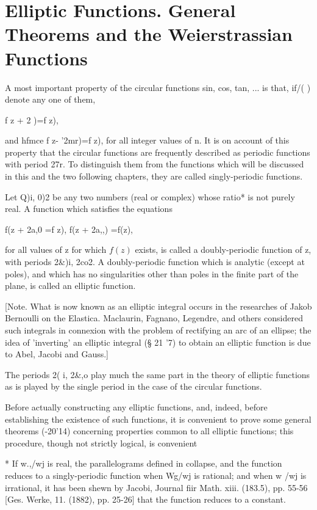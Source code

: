 %
%
\chapter{Elliptic Functions. General Theorems and the
Weierstrassian Functions}


A most important property of the circular functions sin, cos, tan,
... is that, if/( ) denote any one of them,

f z + 2 )=f z),

and hfmce f z- '2mr)=f z), for all integer values of n. It is on
account of this property that the circular functions are frequently
described as periodic functions with period 27r. To distinguish them
from the functions which will be discussed in this and the two
following chapters, they are called singly-periodic functions.

Let Q)i, 0)2 be any two numbers (real or complex) whose ratio* is not
purely real. A function which satisfies the equations

f(z + 2a,0 =f z), f(z + 2a,,) =f(z),

for all values of z for which $f(z)$ exists, is called a doubly-periodic
function of z, with periods 2\&)i, 2co2. A doubly-periodic function
which is analytic (except at poles), and which has no singularities
other than poles in the finite part of the plane, is called an
elliptic function.

[Note. What is now known as an elliptic integral occurs in the
researches of Jakob Bernoulli on the Elastica. Maclaurin, Fagnano,
Legendre, and others considered such integrals in connexion with the
problem of rectifying an arc of an ellipse; the idea of 'inverting'
an elliptic integral (§ 21 '7) to obtain an elliptic function is due
to Abel, Jacobi and Gauss.]

The periods 2( i, 2\&,o play much the same part in the theory of
elliptic functions as is played by the single period in the case of
the circular functions.

Before actually constructing any elliptic functions, and, indeed,
before establishing the existence of such functions, it is convenient
to prove some general theorems (-20'14) concerning properties
common to all elliptic functions; this procedure, though not strictly
logical, is convenient

* If w.,/wj is real, the parallelograms defined in  collapse,
and the function reduces to a singly-periodic function when Wg/wj is
rational; and when w /wj is irrational, it has been shewn by Jacobi,
Journal fiir Math. xiii. (183.5), pp. 55-56 [Ges. Werke, 11. (1882),
pp. 25-26] that the function reduces to a constant.

